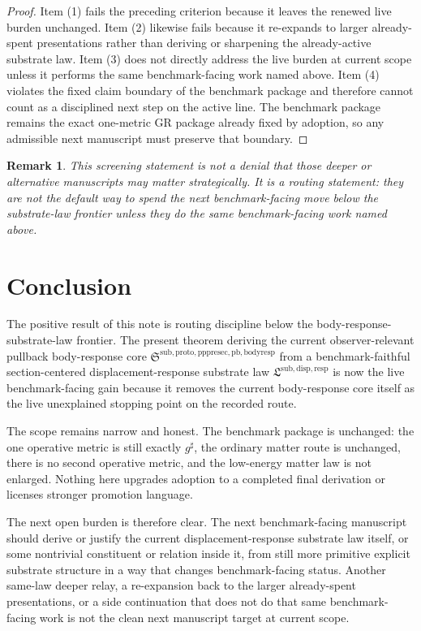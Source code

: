 \documentclass[11pt]{article}
\newcommand{\CompletedMetric}{g^{\sharp}}
\newcommand{\PullbackBodyResponseCore}{\mathfrak S^{\mathrm{sub,proto,pppresec,pb,bodyresp}}}
\newcommand{\SubstrateLaw}{\mathfrak L^{\mathrm{sub,disp,resp}}}
\newtheorem{remark}{Remark}
\begin{document}
\begin{proof}
Item (1) fails the preceding criterion because it leaves the renewed live burden unchanged. Item (2) likewise fails because it re-expands to larger already-spent presentations rather than deriving or sharpening the already-active substrate law. Item (3) does not directly address the live burden at current scope unless it performs the same benchmark-facing work named above. Item (4) violates the fixed claim boundary of the benchmark package and therefore cannot count as a disciplined next step on the active line. The benchmark package remains the exact one-metric GR package already fixed by adoption, so any admissible next manuscript must preserve that boundary.
\end{proof}

\begin{remark}
This screening statement is not a denial that those deeper or alternative manuscripts may matter strategically. It is a routing statement: they are not the default way to spend the next benchmark-facing move below the substrate-law frontier unless they do the same benchmark-facing work named above.
\end{remark}

\section{Conclusion}

The positive result of this note is routing discipline below the body-response-substrate-law frontier. The present theorem deriving the current observer-relevant pullback body-response core \(\PullbackBodyResponseCore\) from a benchmark-faithful section-centered displacement-response substrate law \(\SubstrateLaw\) is now the live benchmark-facing gain because it removes the current body-response core itself as the live unexplained stopping point on the recorded route.

The scope remains narrow and honest. The benchmark package is unchanged: the one operative metric is still exactly \(\CompletedMetric\), the ordinary matter route is unchanged, there is no second operative metric, and the low-energy matter law is not enlarged. Nothing here upgrades adoption to a completed final derivation or licenses stronger promotion language.

The next open burden is therefore clear. The next benchmark-facing manuscript should derive or justify the current displacement-response substrate law itself, or some nontrivial constituent or relation inside it, from still more primitive explicit substrate structure in a way that changes benchmark-facing status. Another same-law deeper relay, a re-expansion back to the larger already-spent presentations, or a side continuation that does not do that same benchmark-facing work is not the clean next manuscript target at current scope.
\end{document}
